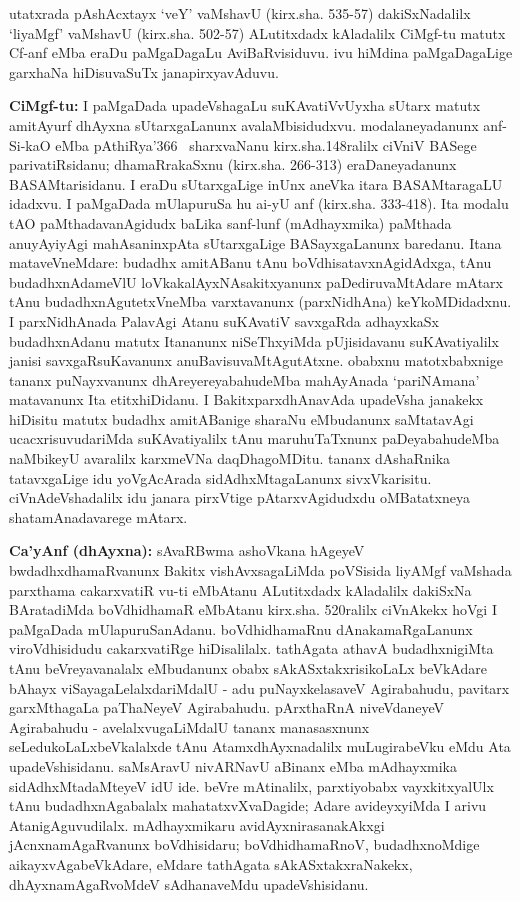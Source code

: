 utatxrada pAshAcxtayx `veY' vaMshavU (kirx.sha. 535-57) dakiSxNadalilx `liyaMgf' vaMshavU (kirx.sha. 502-57) ALutitxdadx kAladalilx CiMgf-tu matutx Cf-anf eMba eraDu paMgaDagaLu AviBaRvisiduvu. ivu hiMdina paMgaDagaLige garxhaNa hiDisuvaSuTx janapirxyavAduvu.

{\bf CiMgf-tu:} I paMgaDada upadeVshagaLu suKAvatiVvUyxha sUtarx matutx ami\-tAyurf dhAyxna sUtarxgaLanunx avalaMbisidudxvu. modalaneyadanunx anf-Si-kaO eMba pAthiRya\char'366~ sharxvaNanu kirx.sha.148ralilx ciVniV BASege parivatiRsidanu; dhamaR\-rakaSxnu (kirx.sha. 266-313) eraDaneyadanunx BASAMtarisidanu. I eraDu sUtarx\-gaLige inUnx aneVka itara BASAMtaragaLU idadxvu. I paMgaDada mUlapuruSa hu ai-yU anf (kirx.sha. 333-418). Ita modalu tAO paMthadavanAgidudx \hbox{baLika} sanf-lunf (mAdhayxmika) paMthada anuyAyiyAgi mahAsaninxpAta sUtarx\-gaLige BASayxgaLanunx baredanu. Itana mataveVneMdare: budadhx amitABanu tAnu boVdhi\-satavxnAgidAdxga, tAnu budadhxnAdameVlU loVkakalAyxNAsakitxyanunx paDediruvaMtAdare mAtarx tAnu budadhxnAgutetxVneMba varxtavanunx (parxNidhAna) keYkoMDidadxnu. I parxNi\-dhAnada PalavAgi Atanu suKAvatiV savxgaRda adhayxkaSx budadhxnAdanu matutx Itananunx niSeThxyiMda pUjisi\-davanu suKAvatiyalilx janisi savxgaRsuKavanunx anuBavisuvaMtAgutAtxne. \hbox{obabxnu} matotxbabxnige tananx puNayxvanunx dhAreyereyabahudeMba mahAyAnada `pari\-NAmana' matavanunx Ita etitxhiDidanu. I BakitxparxdhAnavAda upadeVsha janakekx hiDi\-situ matutx budadhx amitABanige sharaNu eMbudanunx saMtatavAgi ucacxrisuvudariMda suKAvatiyalilx tAnu maruhuTaTxnunx paDeyabahudeMba naMbikeyU avaralilx karxmeVNa daqDhagoMDitu. tananx dAshaRnika tatavxgaLige idu yoVgAcArada sidAdhxMtagaLanunx sivxVkarisitu. ciVnAdeVshadalilx idu janara pirxVtige pAtarxvAgidudxdu oMBatatxneya shatamAnadavarege mAtarx.

{\bf Ca'yAnf (dhAyxna):} sAvaRBwma ashoVkana hAgeyeV bwdadhxdhamaRvanunx Bakitx vishAvxsagaLiMda poVSisida liyAMgf vaMshada parxthama cakarxvatiR vu-ti eMbAtanu ALutitxdadx kAladalilx dakiSxNa BAratadiMda boVdhidhamaR eMbAtanu kirx.sha. 520ralilx ciVnAkekx hoVgi I paMgaDada mUlapuruSanAdanu. boVdhidhamaRnu dAnakamaRgaLanunx viroVdhisidudu cakarxvatiRge hiDisalilalx. tathAgata athavA budadhxnigiMta tAnu beVreyavanalalx eMbudanunx obabx sAkASxtakxrisikoLaLx beVkAdare bAhayx viSayagaLelalxdariMdalU - adu puNayxkelasaveV Agirabahudu, pavitarx garxMthagaLa paThaNeyeV Agirabahudu. pArxthaRnA niveVdaneyeV Agirabahudu - avelalxvugaLiMdalU tananx manasasxnunx seLedukoLaLxbeVkalalxde tAnu AtamxdhAyxnadalilx muLugirabeVku eMdu Ata upadeVshisidanu. saMsAravU nivARNavU aBinanx eMba mAdhayxmika sidAdhxMtadaMteyeV idU ide. beVre mAtinalilx, parxtiyobabx vayxkitxyalUlx tAnu budadhxnAgabalalx mahatatxvXvaDagide; Adare avideyxyiMda I arivu AtanigAguvudilalx. mAdhayxmikaru avidAyxnirasanakAkxgi jAcnxnamAgaRvanunx boVdhisidaru; boVdhidhamaRnoV, budadhxnoMdige aikayxvAgabeVkAdare, eMdare tathAgata sAkASxtakxraNakekx, dhAyxnamAgaRvoMdeV sAdhanaveMdu upadeVshisidanu.

